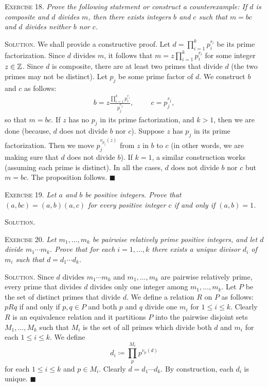 \documentclass[11pt, leqno]{article}
\newcommand{\done}{\ensuremath{\blacksquare}}
\begin{document}
\textsc{Exercise 18}. \emph{Prove the following statement or construct a counterexample: If $d$ is composite and $d$ divides $m$, then there exists integers $b$ and $c$ such that $m=bc$ and $d$ divides neither $b$ nor $c$.}

\textsc{Solution}. We shall provide a constructive proof. Let $d = \prod_{i=1}^k p_i^{r_i}$ be its prime factorization. Since $d$ divides $m$, it follows that $m = z \prod_{i=1}^k p_i^{r_i}$ for some integer $z\in \mathbb{Z}$. Since $d$ is composite, there are at least two primes that divide $d$ (the two primes may not be distinct). Let $p_j$ be some prime factor of $d$. We construct $b$ and $c$ as follows: 
\begin{align*}
b = z \frac{\prod_{i=1}^k p_i^{r_i}}{ p_j^{r_j}}, \hspace{1cm} c = p_j^{r_j},
\end{align*}
so that $m = bc$. If $z$ has no $p_j$ in its prime factorization, and $k>1$, then we are done (because, $d$ does not divide $b$ nor $c$). Suppose $z$ has $p_j$ in its prime factorization. Then we move $p_j^{v_{p_j}(z)}$ from $z$ in $b$ to $c$ (in other words, we are making sure that $d$ does not divide $b$). If $k=1$, a similar construction works (assuming each prime is distinct). In all the cases, $d$ does not divide $b$ nor $c$ but $m = bc$. The proposition follows. \done

\textsc{Exercise 19}. \emph{Let $a$ and $b$ be positive integers. Prove that $(a,bc) = (a,b)(a,c)$ for every positive integer $c$ if and only if $(a,b)=1$.}

\textsc{Solution}.

\textsc{Exercise 20}. \emph{Let $m_1, \ldots, m_k$ be pairwise relatively prime positive integers, and let $d$ divide $m_1\cdots m_k$. Prove that for each $i = 1, \ldots, k$ there exists a unique divisor $d_i$ of $m_i$ such that $d= d_1\cdots d_k$.}

\textsc{Solution}. Since $d$ divides $m_1\cdots m_k$ and $m_1, \ldots, m_k$ are pairwise relatively prime, every prime that divides $d$ divides only one integer among $m_1, \ldots, m_k$. Let $P$ be the set of distinct primes that divide $d$. We define a relation $R$ on $P$ as follows: $pRq$ if and only if $p,q\in P$ and both $p$ and $q$ divide one $m_i$ for $1\leq i \leq k$. Clearly $R$ is an equivalence relation and it partitions $P$ into the pairwise disjoint sets $M_1, \ldots, M_k$ such that $M_i$ is the set of all primes which divide both $d$ and $m_i$ for each $1 \leq i \leq k$. We define 
\begin{displaymath}
d_i \coloneqq \prod_p^{M_i} p^{v_p(d)}
\end{displaymath}
for each $1 \leq i \leq k$ and $p\in M_i$. Clearly $d = d_1\cdots d_k$. By construction, each $d_i$ is unique. \done
\end{document}
